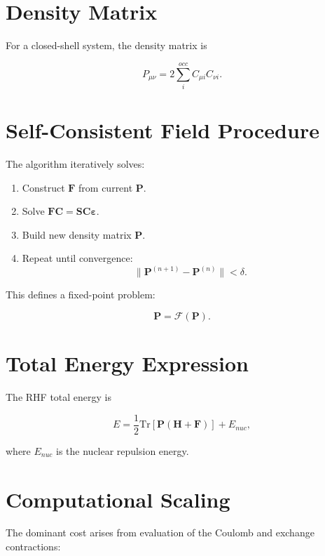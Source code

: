 \documentclass[11pt]{article}
\begin{document}
\section{Density Matrix}

For a closed-shell system, the density matrix is

\begin{equation}
P_{\mu\nu} =
2 \sum_{i}^{occ}
C_{\mu i} C_{\nu i}.
\end{equation}

\section{Self-Consistent Field Procedure}

The algorithm iteratively solves:

\begin{enumerate}
\item Construct $\mathbf{F}$ from current $\mathbf{P}$.
\item Solve $\mathbf{F}\mathbf{C} = \mathbf{S}\mathbf{C}\bm{\varepsilon}$.
\item Build new density matrix $\mathbf{P}$.
\item Repeat until convergence:
\[
\|\mathbf{P}^{(n+1)} - \mathbf{P}^{(n)}\| < \delta.
\]
\end{enumerate}

This defines a fixed-point problem:

\begin{equation}
\mathbf{P} = \mathcal{F}(\mathbf{P}).
\end{equation}

\section{Total Energy Expression}

The RHF total energy is

\begin{equation}
E =
\frac{1}{2}
\mathrm{Tr}
\left[
\mathbf{P}
(\mathbf{H} + \mathbf{F})
\right]
+ E_{nuc},
\end{equation}

where $E_{nuc}$ is the nuclear repulsion energy.

\section{Computational Scaling}

The dominant cost arises from evaluation of the Coulomb and exchange contractions:
\end{document}
